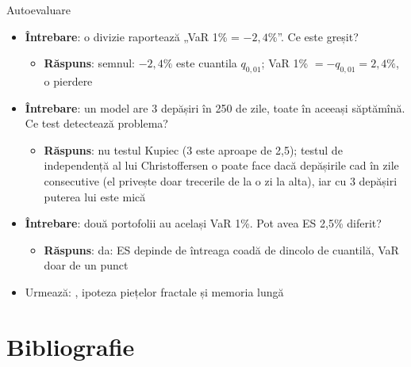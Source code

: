 \begin{frame}{Autoevaluare}
\itemsize{\small}
\begin{itemize}
    \item \textbf{Întrebare}: o divizie raportează „VaR 1\% = $-2{,}4\%$”. Ce este greșit?
    \begin{itemize}
        \item \textbf{Răspuns}: semnul: $-2{,}4\%$ este cuantila $q_{0{,}01}$; VaR 1\% $= -q_{0{,}01} = 2{,}4\%$, o pierdere
    \end{itemize}
    \item \textbf{Întrebare}: un model are 3 depășiri în 250 de zile, toate în aceeași săptămînă. Ce test detectează problema?
    \begin{itemize}
        \item \textbf{Răspuns}: nu testul Kupiec (3 este aproape de 2,5); testul de independență al lui Christoffersen o poate face dacă depășirile cad în zile consecutive (el privește doar trecerile de la o zi la alta), iar cu 3 depășiri puterea lui este mică
    \end{itemize}
    \item \textbf{Întrebare}: două portofolii au același VaR 1\%. Pot avea ES 2,5\% diferit?
    \begin{itemize}
        \item \textbf{Răspuns}: da: ES depinde de întreaga coadă de dincolo de cuantilă, VaR doar de un punct
    \end{itemize}
    \item Urmează: , ipoteza piețelor fractale și memoria lungă
\end{itemize}
\end{frame}


\section{Bibliografie}

